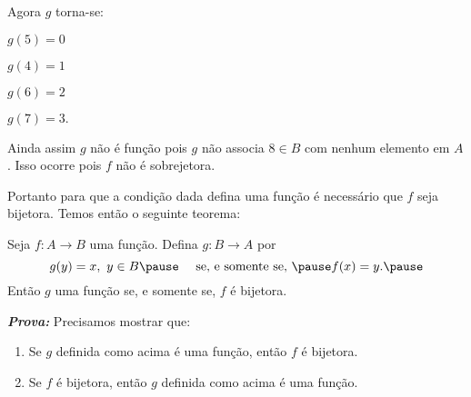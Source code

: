 \documentclass{beamer}
\begin{document}
    \begin{frame}
        Agora $g$ torna-se:\pause
        \begin{center}
            $g(5) = 0$\pause\\

            \vspace{.3cm}

            $g(4) = 1$\pause\\

            \vspace{.3cm}

            $g(6) = 2$\\

            \vspace{.3cm}

            $g(7) = 3.$\pause
        \end{center}

        Ainda assim $g$ n\~ao \'e fun\c{c}\~ao \pause pois $g$ n\~ao associa $8 \in B$ \pause com nenhum elemento em $A$.  Isso ocorre pois \pause $f$ n\~ao \'e sobrejetora.\pause

        \vspace{.3cm}

        Portanto para que a condi\c{c}\~ao dada \pause defina uma fun\c{c}\~ao \pause \'e necess\'ario que $f$ seja bijetora. \pause Temos ent\~ao o seguinte teorema:\pause
    \end{frame}

    \begin{frame}
        \begin{teorema}
            Seja $f: A \to B$ uma fun{\c c}{\~a}o. \pause Defina $g : B \to A$ \pause por\pause
            \[
                g(y) = x,\ y \in B \pause \quad \mbox{ se, e somente se, } \pause f(x) = y.\pause
            \]
            Ent{\~a}o $g$  uma fun{\c c}{\~a}o \pause se, e somente se, \pause $f$ {\'e} bijetora.\pause
        \end{teorema}
        \noindent \textbf{\textit{Prova:}}
        Precisamos mostrar que:\pause
        \begin{enumerate}[label={\roman*})]
            \item Se $g$ definida como acima \'e uma fun\c{c}\~ao, \pause ent\~ao $f$ \'e bijetora.\pause

            \vspace{.3cm}

            \item Se $f$ \'e bijetora, \pause ent\~ao $g$ definida como acima \'e uma fun\c{c}\~ao.\pause
        \end{enumerate}
    \end{frame}
\end{document}
